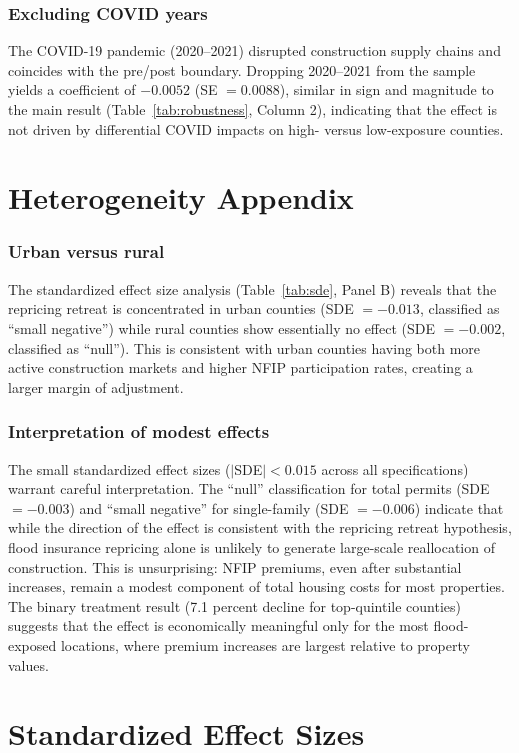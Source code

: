 \documentclass[12pt]{article}
\begin{document}
\subsubsection*{Excluding COVID years} The COVID-19 pandemic (2020--2021) disrupted construction supply chains and coincides with the pre/post boundary. Dropping 2020--2021 from the sample yields a coefficient of $-0.0052$ (SE $= 0.0088$), similar in sign and magnitude to the main result (Table~\ref{tab:robustness}, Column 2), indicating that the effect is not driven by differential COVID impacts on high- versus low-exposure counties.


\section{Heterogeneity Appendix}
\label{sec:app_het}

\subsubsection*{Urban versus rural} The standardized effect size analysis (Table~\ref{tab:sde}, Panel B) reveals that the repricing retreat is concentrated in urban counties (SDE $= -0.013$, classified as ``small negative'') while rural counties show essentially no effect (SDE $= -0.002$, classified as ``null''). This is consistent with urban counties having both more active construction markets and higher NFIP participation rates, creating a larger margin of adjustment.

\subsubsection*{Interpretation of modest effects} The small standardized effect sizes ($|$SDE$| < 0.015$ across all specifications) warrant careful interpretation. The ``null'' classification for total permits (SDE $= -0.003$) and ``small negative'' for single-family (SDE $= -0.006$) indicate that while the direction of the effect is consistent with the repricing retreat hypothesis, flood insurance repricing alone is unlikely to generate large-scale reallocation of construction. This is unsurprising: NFIP premiums, even after substantial increases, remain a modest component of total housing costs for most properties. The binary treatment result (7.1 percent decline for top-quintile counties) suggests that the effect is economically meaningful only for the most flood-exposed locations, where premium increases are largest relative to property values.


\section{Standardized Effect Sizes}
\label{sec:sde}


\end{document}
